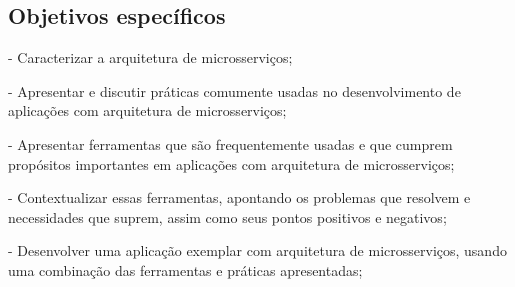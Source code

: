 \subsection{Objetivos específicos}\label{sec-objetivos-especificos}

- Caracterizar a arquitetura de microsserviços;

- Apresentar e discutir práticas comumente usadas no desenvolvimento de aplicações com arquitetura de microsserviços;






- Apresentar ferramentas que são frequentemente usadas e que cumprem propósitos importantes em aplicações com arquitetura de microsserviços;

- Contextualizar essas ferramentas, apontando os problemas que resolvem e necessidades que suprem, assim como seus pontos positivos e negativos;

- Desenvolver uma aplicação exemplar com arquitetura de microsserviços, usando uma combinação das ferramentas e práticas apresentadas;




